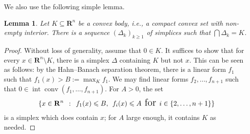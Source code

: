 \documentclass{amsart}
\newcommand{\st}{\ : \ }
\renewcommand{\leq}{\leqslant}
\renewcommand{\geq}{\geqslant}
\renewcommand{\subset}{\subseteq}
\newcommand{\R}{\mathbf{R}}
\DeclareMathOperator{\conv}{\mathrm{conv}}
\DeclareMathOperator{\inter}{int}
\theoremstyle{plain}
\newtheorem{lemma}[theorem]{Lemma}
\begin{document}
We also use the following simple lemma.

\begin{lemma} \label{lemma:intersection-of-simplices}
Let $K \subset \R^n$ be a convex body, i.e., a compact convex set with non-empty interior. There is a sequence $(\Delta_k)_{k \geq 1}$ of simplices such that $\bigcap \Delta_k = K$.
\end{lemma}

\begin{proof}
Without loss of generality, assume that $0 \in K$. It suffices to show that for every $x \in \R^n \setminus K$, there is a simplex $\Delta$ containing $K$ but not $x$. This can be seen as follows: by the Hahn--Banach separation theorem, there is a linear form $f_1$ such that $f_1(x) > B := \max_K f_1$. We may find linear forms $f_2,\dots,f_{n+1}$ such that $0 \in \inter \conv (f_1,\dots,f_{n+1})$. For $A>0$, the set
\[ \Large\{ x \in \R^n \st f_1(x) \leq B,\  f_i(x) \leq A \textnormal{ for } i \in \{2,\dots,n+1\} \Large\} \]
is a simplex which does contain $x$; for $A$ large enough, it contains $K$ as needed.
\end{proof}
\end{document}
